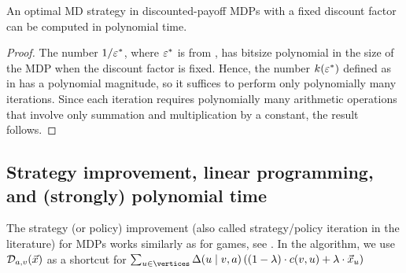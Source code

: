\begin{corollary}
\label{5-cor:VI-optimal-strategy-comp}
An optimal MD strategy in discounted-payoff MDPs with a fixed discount factor can be computed in polynomial time. 
\end{corollary}
\begin{proof}
The number $1/\varepsilon^*$, where $\varepsilon^*$ is from , has bitsize polynomial in the size of the MDP when the discount factor is fixed. Hence, the number $k(\varepsilon^*)$ defined as in  has a polynomial magnitude, so it suffices to perform only polynomially many iterations. Since each iteration requires polynomially many arithmetic operations that involve only summation and multiplication by a constant, the result follows.
\end{proof}

\subsection*{Strategy improvement, linear programming, and (strongly) polynomial time}

The strategy (or policy) improvement (also called strategy/policy iteration in the literature) for MDPs works similarly as for games, see . In the algorithm, we use $\mathcal{D}_{a,v}(\vec{x})$ as a shortcut for $ \sum_{u \in \vertices}\probTranFunc(u\mid v,a)\left((1-\lambda)\cdot\colouring(v,u) + \lambda\cdot \vec{x}_u \right)$


